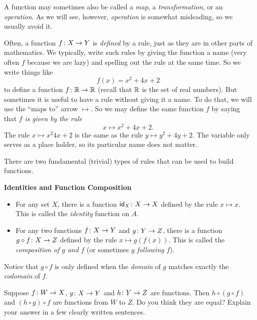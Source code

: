 A function may sometimes also be called a \emph{map}, a \emph{transformation}, or an \emph{operation}. 
As we will see, however, \emph{operation} is somewhat misleading, so we usually avoid it. 

Often, a function ${f}\colon{X}\to{Y}$ is \emph{defined} by a rule, just as they are in other parts of mathematics. 
We typically, write such rules by giving the function a name (very often $f$ because we are lazy) and spelling out the rule at the same time.
So we write things like
\[f(x)=x^2 + 4x + 2\]
to define a function ${f}\colon{\mathbb R}\to{\mathbb R}$ (recall that $\mathbb R$ is the set of real numbers).
But sometimes it is useful to have a rule without giving it a name.
To do that, we will use the ``maps to'' arrow $\mapsto$.
So we may define the same function $f$ by saying that \emph{$f$ is given by the rule}
	\[x\mapsto x^2 + 4x + 2.\]
The rule $x\mapsto x^2  4x + 2$ is the same as the rule $y\mapsto y^2 + 4y + 2$. 
The variable only serves as a place holder, so its particular name does not matter.

There are two fundamental (trivial) types of rules that can be used to build functions.

\begin{principle}
	\noindent\textbf{Identities and Function Composition}
	
	\begin{itemize}
		\item For any set $X$, there is a function ${\textsf{id}_X}\colon{X}\to{X}$ defined by the rule $x\mapsto x$.
		This is called the \emph{identity} function on $A$.
		\item For any two functions ${f}\colon{X}\to{Y}$ and ${g}\colon{Y}\to{Z}$, there is a function ${g\circ f}\colon{X}\to{Z}$ defined by the rule $x\mapsto g(f(x))$.
		This is called the \emph{composition of $g$ and $f$} (or sometimes \emph{$g$ following $f$}).
	\end{itemize}
\end{principle}

Notice that $g\circ f$ is only defined when the \emph{domain} of $g$ matches exactly the \emph{codomain} of $f$.

\begin{exercises}
	\begin{firstexercise}
\item Suppose ${f}\colon{W}\to{X}$, ${g}\colon{X}\to{Y}$ and ${h}\colon{Y}\to{Z}$ are functions. Then $h\circ(g\circ f)$ and $(h\circ g)\circ f$ are functions
from $W$ to $Z$. Do you think they are equal? Explain your answer in a few clearly written sentences.	
\end{firstexercise}
\end{exercises}

